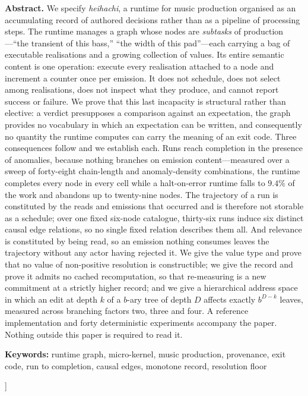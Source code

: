 \documentclass[11pt,twocolumn,a4paper]{article}
\theoremstyle{definition}
\theoremstyle{remark}
\begin{document}
\begin{@twocolumnfalse}
\begin{center}
\begin{minipage}{0.92\textwidth}
\textbf{Abstract.}
We specify \emph{heihachi}, a runtime for music production organised as an
accumulating record of authored decisions rather than as a pipeline of
processing steps. The runtime manages a graph whose nodes are \emph{subtasks} of
production---``the transient of this bass,'' ``the width of this pad''---each
carrying a bag of executable realisations and a growing collection of values. Its
entire semantic content is one operation: execute every realisation attached to a
node and increment a counter once per emission. It does not schedule, does not
select among realisations, does not inspect what they produce, and cannot report
success or failure. We prove that this last incapacity is structural rather than
elective: a verdict presupposes a comparison against an expectation, the graph
provides no vocabulary in which an expectation can be written, and consequently
no quantity the runtime computes can carry the meaning of an exit code. Three
consequences follow and we establish each. Runs reach completion in the presence
of anomalies, because nothing branches on emission content---measured over a
sweep of forty-eight chain-length and anomaly-density combinations, the runtime
completes every node in every cell while a halt-on-error runtime falls to
$9.4\%$ of the work and abandons up to twenty-nine nodes. The trajectory of a run
is constituted by the reads and emissions that occurred and is therefore not
storable as a schedule; over one fixed six-node catalogue, thirty-six runs induce
six distinct causal edge relations, so no single fixed relation describes them
all. And relevance is constituted by being read, so an emission nothing consumes
leaves the trajectory without any actor having rejected it. We give the value
type and prove that no value of non-positive resolution is constructible; we give
the record and prove it admits no cached recomputation, so that re-measuring is a
new commitment at a strictly higher record; and we give a hierarchical address
space in which an edit at depth $k$ of a $b$-ary tree of depth $D$ affects exactly
$b^{D-k}$ leaves, measured across branching factors two, three and four. A
reference implementation and forty deterministic experiments accompany the paper.
Nothing outside this paper is required to read it.
\end{minipage}

\vspace{8pt}
\noindent\textbf{Keywords:}
runtime graph, micro-kernel, music production, provenance, exit code,
run to completion, causal edges, monotone record, resolution floor

\vspace{18pt}
\end{center}
\end{@twocolumnfalse}
]
\end{document}
